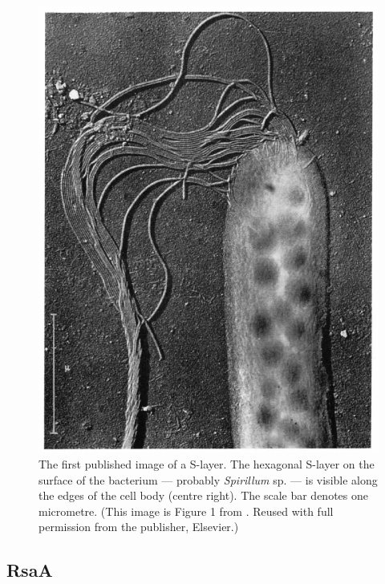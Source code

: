 \begin{figure}[htb] %
  \begin{center}
    \includegraphics{intro/img/firstslayer.pdf}
  \end{center}
  \caption[The first published image of a \ac{S-layer}]{The first published image of a
    \ac{S-layer}. The hexagonal \ac{S-layer} on the surface of the bacterium --- probably
    \textit{Spirillum} sp. --- is visible along the edges of the cell body (centre right). The scale
    bar denotes one micrometre. (This image is Figure 1 from . Reused with
    full permission from the publisher, Elsevier.)}
  \label{fig:firstslayer}
\end{figure} %


\subsection{RsaA} \label{sec:intro-rsaa}

